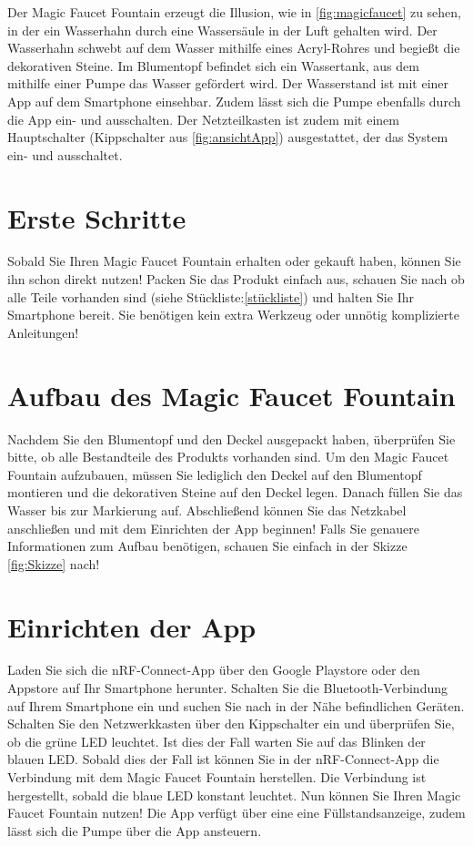 Der Magic Faucet Fountain erzeugt die Illusion, wie in \ref{fig:magicfaucet} zu sehen, in der ein Wasserhahn durch eine Wassersäule in der Luft gehalten wird. Der Wasserhahn schwebt auf dem Wasser mithilfe eines Acryl-Rohres und begießt die dekorativen Steine. Im Blumentopf befindet sich ein Wassertank, aus dem mithilfe einer Pumpe das Wasser gefördert wird. Der Wasserstand ist mit einer App auf dem Smartphone einsehbar. Zudem lässt sich die Pumpe ebenfalls durch die App ein- und ausschalten. Der Netzteilkasten ist zudem mit einem Hauptschalter (Kippschalter aus \ref{fig:ansichtApp}) ausgestattet, der das System ein- und ausschaltet. 

\section{Erste Schritte}
Sobald Sie Ihren Magic Faucet Fountain erhalten oder gekauft haben, können Sie ihn schon direkt nutzen! Packen Sie das Produkt einfach aus, schauen Sie nach ob alle Teile vorhanden sind (siehe Stückliste:\ref{stückliste}) und halten Sie Ihr Smartphone bereit. Sie benötigen kein extra Werkzeug oder unnötig komplizierte Anleitungen!

\section{Aufbau des Magic Faucet Fountain}
Nachdem Sie den Blumentopf und den Deckel ausgepackt haben, überprüfen Sie bitte, ob alle Bestandteile des Produkts vorhanden sind. Um den Magic Faucet Fountain aufzubauen, müssen Sie lediglich den Deckel auf den Blumentopf montieren und die dekorativen Steine auf den Deckel legen. Danach füllen Sie das Wasser bis zur Markierung auf. Abschließend können Sie das Netzkabel anschließen und mit dem Einrichten der App beginnen! Falls Sie genauere Informationen zum Aufbau benötigen, schauen Sie einfach in der Skizze \ref{fig:Skizze} nach!

\section{Einrichten der App}
Laden Sie sich die nRF-Connect-App über den Google Playstore oder den Appstore auf Ihr Smartphone herunter. Schalten Sie die Bluetooth-Verbindung auf Ihrem Smartphone ein und suchen Sie nach in der Nähe befindlichen Geräten. Schalten Sie den Netzwerkkasten über den Kippschalter ein und überprüfen Sie, ob die grüne LED leuchtet. Ist dies der Fall warten Sie auf das Blinken der blauen LED. Sobald dies der Fall ist können Sie in der nRF-Connect-App die Verbindung mit dem Magic Faucet Fountain herstellen. Die Verbindung ist hergestellt, sobald die blaue LED konstant leuchtet. Nun können Sie Ihren Magic Faucet Fountain nutzen!
Die App verfügt über eine eine Füllstandsanzeige, zudem lässt sich die Pumpe über die App ansteuern.


